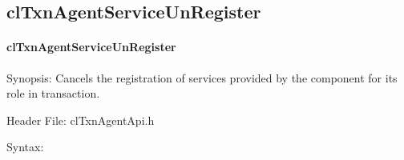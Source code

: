 \begin{flushleft}
\subsection{clTxnAgentServiceUnRegister}
\hypertarget{pagetxn204}{}\paragraph{cl\-Txn\-Agent\-Service\-Un\-Register}\label{pagetxn204}
\begin{Desc}
\item[Synopsis:]Cancels the registration of services provided by the component for its role in transaction.\end{Desc}
\begin{Desc}
\item[Header File:]clTxnAgentApi.h\end{Desc}
\begin{Desc}
\item[Syntax:]


\end{Desc}
\end{flushleft}
